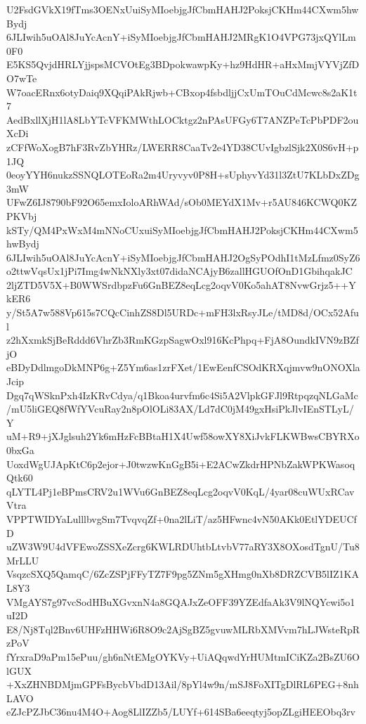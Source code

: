 U2FsdGVkX19fTms3OENxUuiSyMIoebjgJfCbmHAHJ2PoksjCKHm44CXwm5hwBydj
6JLIwih5uOAl8JuYcAcnY+iSyMIoebjgJfCbmHAHJ2MRgK1O4VPG73jxQYlLm0F0
E5KS5QvjdHRLYjjspsMCVOtEg3BDpokwawpKy+hz9HdHR+aHxMmjVYVjZfDO7wTe
W7oacERnx6otyDaiq9XQqiPAkRjwb+CBxop4fsbdljjCxUmTOuCdMcwc8s2aK1t7
AedBxllXjH1lA8LbYTcVFKMWthLOCktgz2nPAsUFGy6T7ANZPeTcPbPDF2ouXcDi
zCFfWoXogB7hF3RvZbYHRz/LWERR8CaaTv2e4YD38CUvIgbzlSjk2X0S6vH+p1JQ
0eoyYYH6nukzSSNQLOTEoRa2m4Uryvyv0P8H+sUphyvYd31l3ZtU7KLbDxZDg3mW
UFwZ6IJ8790bF92O65emxIoloARhWAd/sOb0MEYdX1Mv+r5AU846KCWQ0KZPKVbj
kSTy/QM4PxWxM4mNNoCUxuiSyMIoebjgJfCbmHAHJ2PoksjCKHm44CXwm5hwBydj
6JLIwih5uOAl8JuYcAcnY+iSyMIoebjgJfCbmHAHJ2OgSyPOdhI1tMzLfmz0SyZ6
o2ttwVqsUx1jPi7Img4wNkNXly3xt07didaNCAjyB6zallHGUOfOnD1GbihqakJC
2ljZTD5V5X+B0WWSrdbpzFu6GnBEZ8eqLcg2oqvV0Ko5ahAT8NvwGrjz5++YkER6
y/St5A7w588Vp615s7CQcCinhZS8Dl5URDc+mFH3lxRsyJLe/tMD8d/OCx52Aful
z2hXxmkSjBeRddd6VhrZb3RmKGzpSagwOxl916KcPhpq+FjA8OundkIVN9zBZfjO
eBDyDdlmgoDkMNP6g+Z5Ym6as1zrFXet/1EwEenfCSOdKRXqjmvw9nONOXlaJcip
Dgq7qWSknPxh4IzKRvCdya/q1Bkoa4urvfm6c4Si5A2VlpkGFJl9RtpqzqNLGaMc
/mU5liGEQ8fWfYVcuRay2n8pOlOLi83AX/Ld7dC0jM49gxHsiPkJlvIEnSTLyL/Y
uM+R9+jXJglsuh2Yk6mHzFcBBtaH1X4Uwf58owXY8XiJvkFLKWBwsCBYRXo0bxGa
UoxdWgUJApKtC6p2ejor+J0twzwKnGgB5i+E2ACwZkdrHPNbZakWPKWasoqQtk60
qLYTL4Pj1eBPmsCRV2u1WVu6GnBEZ8eqLcg2oqvV0KqL/4yar08cuWUxRCavVtra
VPPTWIDYaLulllbvgSm7TvqvqZf+0na2lLiT/az5HFwnc4vN50AKk0EtlYDEUCfD
uZW3W9U4dVFEwoZSSXeZcrg6KWLRDUhtbLtvbV77aRY3X8OXosdTgnU/Tu8MrLLU
VsqzcSXQ5QamqC/6ZcZSPjFFyTZ7F9pg5ZNm5gXHmg0nXb8DRZCVB5lIZ1KAL8Y3
VMgAYS7g97vcSodHBuXGvxnN4a8GQAJxZeOFF39YZEdfaAk3V9lNQYcwi5o1uI2D
E8/Nj8Tql2Bnv6UHFzHHWi6R8O9c2AjSgBZ5gvuwMLRbXMVvm7hLJWsteRpRzPoV
fYrxraD9aPm15ePuu/gh6nNtEMgOYKVy+UiAQqwdYrHUMtmICiKZa2BsZU6OlGUX
+XxZHNBDMjmGPFsBycbVbdD13Ail/8pYl4w9n/mSJ8FoXITgDlRL6PEG+8nhLAVO
eZJcPZJbC36nu4M4O+Aog8LlIZZb5/LUYf+614SBa6eeqtyj5opZLgiHEEObq3rv
